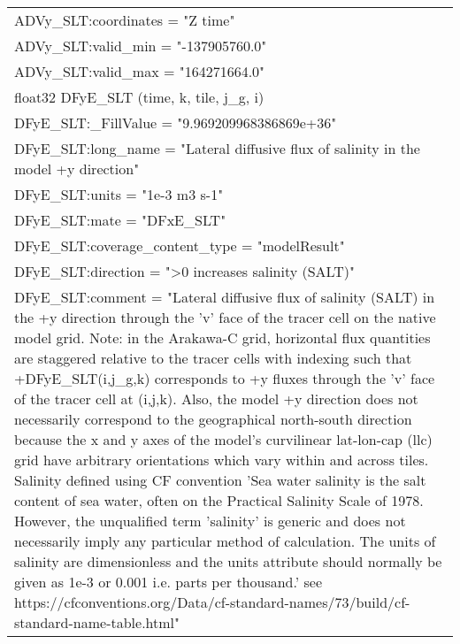 \begin{longtable}{|p{\textwidth}|}
\hspace{0.5cm}\hspace{0.5cm}ADVy\_SLT:coordinates = "Z time"\\
\hspace{0.5cm}\hspace{0.5cm}ADVy\_SLT:valid\_min = "-137905760.0"\\
\hspace{0.5cm}\hspace{0.5cm}ADVy\_SLT:valid\_max = "164271664.0"\\
\hspace{0.5cm}float32 DFyE\_SLT (time, k, tile, j\_g, i)\\
\hspace{0.5cm}\hspace{0.5cm}DFyE\_SLT:\_FillValue = "9.969209968386869e+36"\\
\hspace{0.5cm}\hspace{0.5cm}DFyE\_SLT:long\_name = "Lateral diffusive flux of salinity in the model +y direction"\\
\hspace{0.5cm}\hspace{0.5cm}DFyE\_SLT:units = "1e-3 m3 s-1"\\
\hspace{0.5cm}\hspace{0.5cm}DFyE\_SLT:mate = "DFxE\_SLT"\\
\hspace{0.5cm}\hspace{0.5cm}DFyE\_SLT:coverage\_content\_type = "modelResult"\\
\hspace{0.5cm}\hspace{0.5cm}DFyE\_SLT:direction = ">0 increases salinity (SALT)"\\
\hspace{0.5cm}\hspace{0.5cm}DFyE\_SLT:comment = "Lateral diffusive flux of salinity (SALT) in the +y direction through the 'v' face of the tracer cell on the native model grid. Note: in the Arakawa-C grid, horizontal flux quantities are staggered relative to the tracer cells with indexing such that +DFyE\_SLT(i,j\_g,k) corresponds to +y fluxes through the 'v' face of the tracer cell at (i,j,k). Also, the model +y direction does not necessarily correspond to the geographical north-south direction because the x and y axes of the model's curvilinear lat-lon-cap (llc) grid have arbitrary orientations which vary within and across tiles. Salinity defined using CF convention 'Sea water salinity is the salt content of sea water, often on the Practical Salinity Scale of 1978. However, the unqualified term 'salinity' is generic and does not necessarily imply any particular method of calculation. The units of salinity are dimensionless and the units attribute should normally be given as 1e-3 or 0.001 i.e. parts per thousand.' see https://cfconventions.org/Data/cf-standard-names/73/build/cf-standard-name-table.html"\\

\end{longtable}
